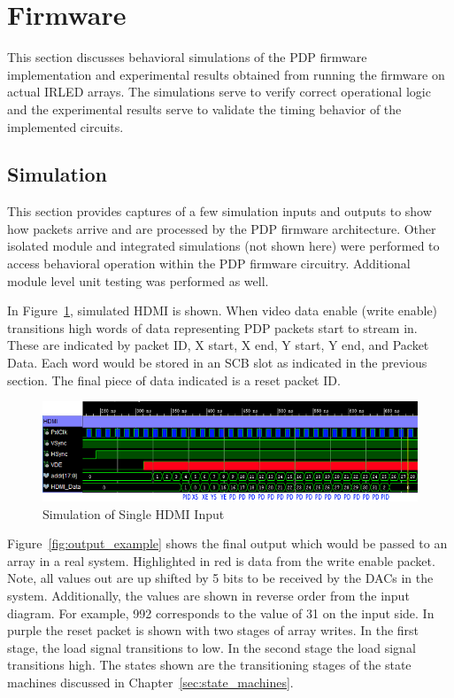\section{Firmware}
    This section discusses behavioral simulations of the PDP firmware implementation and experimental results obtained from running the firmware on actual IRLED arrays. The simulations serve to verify correct operational logic and the experimental results serve to validate the timing behavior of the implemented circuits.

    \subsection{Simulation}
    This section provides captures of a few simulation inputs and outputs to show how packets arrive and are processed by the PDP firmware architecture. Other isolated module and integrated simulations (not shown here) were performed to access behavioral operation within the PDP firmware circuitry. Additional module level unit testing was performed as well.

    In Figure~\ref{fig:input_example}, simulated HDMI is shown. When video data enable (write enable) transitions high words of data representing PDP packets start to stream in. These are indicated by packet ID, X start, X end, Y start, Y end, and Packet Data. Each word would be stored in an SCB slot as indicated in the previous section. The final piece of data indicated is a reset packet ID.

    \begin{figure}
        \centering
        \includegraphics[width=1.0\textwidth]{fig/pdp_input_example.png}
        \caption{Simulation of Single HDMI Input}
        \label{fig:input_example}
    \end{figure}

    Figure~\ref{fig:output_example} shows the final output which would be passed to an array in a real system. Highlighted in red is data from the write enable packet. Note, all values out are up shifted by 5 bits to be received by the DACs in the system. Additionally, the values are shown in reverse order from the input diagram. For example, 992 corresponds to the value of 31 on the input side. In purple the reset packet is shown with two stages of array writes. In the first stage, the load signal transitions to low. In the second stage the load signal transitions high. The states shown are the transitioning stages of the state machines discussed in Chapter~\ref{sec:state_machines}.

